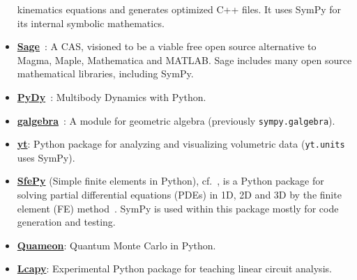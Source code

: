 \begin{itemize}
  kinematics equations and generates optimized C++ files. It uses SymPy for
  its internal symbolic mathematics.
\item
  \href{http://www.sagemath.org/}{\textbf{Sage}}~\cite{sagemath}: A CAS, visioned to be
  a viable free open source alternative to Magma, Maple, Mathematica and
  MATLAB\@. Sage includes many open source mathematical libraries, including
  SymPy.
\item
  \href{http://www.pydy.org/}{\textbf{PyDy}}~\cite{gede2013constrained}: Multibody Dynamics with
  Python.
\item
  \href{https://github.com/brombo/galgebra}{\textbf{galgebra}}~\cite{galgebra}:
  A module for geometric algebra (previously \texttt{sympy.galgebra}).
\item
  \href{http://yt-project.org/}{\textbf{yt}}: Python package for
  analyzing and visualizing volumetric data (\texttt{yt.units} uses SymPy).
\item
  \href{http://sfepy.org/}{\textbf{SfePy}} (Simple finite elements in Python),
  cf.~\cite{cimrman2014sfepy}, is a Python package for solving partial
  differential equations (PDEs) in 1D, 2D and 3D by the finite element (FE)
  method~\cite{Zienkiewicz2013FEM}. SymPy is used within this package mostly for
  code generation and testing.
\item
  \href{http://quameon.sourceforge.net/}{\textbf{Quameon}}: Quantum
  Monte Carlo in Python.
\item
  \href{http://lcapy.elec.canterbury.ac.nz/}{\textbf{Lcapy}}:
  Experimental Python package for teaching linear circuit analysis.
\end{itemize}
